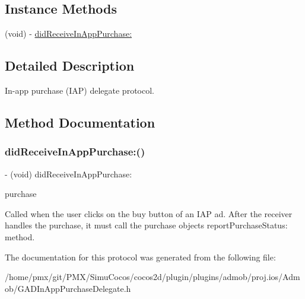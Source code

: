 \subsection*{Instance Methods}
\begin{DoxyCompactItemize}
\item 
(void) -\/ \hyperlink{protocolGADInAppPurchaseDelegate-p_a11b709c997cd7e4abecfdefd7f737485}{did\+Receive\+In\+App\+Purchase\+:}
\end{DoxyCompactItemize}


\subsection{Detailed Description}
In-\/app purchase (I\+AP) delegate protocol. 

\subsection{Method Documentation}
\mbox{\label{protocolGADInAppPurchaseDelegate-p_a11b709c997cd7e4abecfdefd7f737485}} 
\subsubsection{\texorpdfstring{did\+Receive\+In\+App\+Purchase\+:()}{didReceiveInAppPurchase:()}}
{\footnotesize\ttfamily -\/ (void) did\+Receive\+In\+App\+Purchase\+: \begin{DoxyParamCaption}\item[{(\hyperlink{interfaceGADInAppPurchase}{G\+A\+D\+In\+App\+Purchase} $\ast$)}]{purchase }\end{DoxyParamCaption}}

Called when the user clicks on the buy button of an I\+AP ad. After the receiver handles the purchase, it must call the purchase object\textquotesingle{}s report\+Purchase\+Status\+: method. 

The documentation for this protocol was generated from the following file\+:\begin{DoxyCompactItemize}
\item 
/home/pmx/git/\+P\+M\+X/\+Simu\+Cocos/cocos2d/plugin/plugins/admob/proj.\+ios/\+Admob/G\+A\+D\+In\+App\+Purchase\+Delegate.\+h\end{DoxyCompactItemize}
